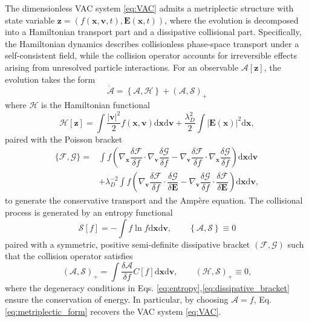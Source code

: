 \documentclass[preprint,1p,times]{elsarticle}
\theoremstyle{definition}
\theoremstyle{remark}
\begin{document}
The dimensionless VAC system \eqref{eq:VAC} admits a metriplectic structure \cite{morrison1986paradigm} with state variable $\bm z=(f(\bm{x},\bm{v},t), \bm{E}(\bm{x},t))$, where the evolution is decomposed into a Hamiltonian transport part and a dissipative collisional part. Specifically, the Hamiltonian dynamics describes collisionless phase-space transport under a self-consistent field, while the collision operator accounts for irreversible effects arising from unresolved particle interactions. 
For an observable $\mathcal{A}[\bm z]$, the evolution takes the form
\begin{equation}
\dot{\mathcal{A}} = \left\{\mathcal{A}, \mathcal{H}\right\} + \left(\mathcal{A}, \mathcal{S}\right)_+
\label{eq:metriplectic_form}
\end{equation}
where $\mathcal{H}$ is the Hamiltonian functional 
\begin{equation*}
    \mathcal{H}[\bm z] = \int \dfrac{|\bm{v}|^{2}}{2} f(\bm{x},\bm{v}) \mathrm{d} \bm{x} \mathrm{d} \bm{v} + \dfrac{\lambda_{D}^{2}}{2} \int |\bm{E}(\bm{x})|^{2} \mathrm{d} \bm{x},
\label{eq:energy}
\end{equation*}
paired with the Poisson bracket
\begin{equation}\label{eq:poisson_bracket}
\begin{aligned}
    \{ \mathcal{F} , \mathcal{G} \} =& \int f \left( \nabla_{\bm{x}}\dfrac{\delta \mathcal{F}}{\delta f} \cdot \nabla_{\bm{v}}\dfrac{\delta \mathcal{G}}{\delta f}  - \nabla_{\bm{v}}\dfrac{\delta \mathcal{F}}{\delta f} \cdot \nabla_{\bm{x}}\dfrac{\delta \mathcal{G}}{\delta f} \right) \mathrm{d}\bm{x} \mathrm{d} \bm{v} \\
    &+ \lambda_{D}^{-2} \int f \left( \nabla_{\bm{v}} \dfrac{\delta \mathcal{F}}{\delta f} \cdot \dfrac{\delta \mathcal{G}}{\delta \bm{E}} - \nabla_{\bm{v}} \dfrac{\delta \mathcal{G}}{\delta f} \cdot \dfrac{\delta \mathcal{F}}{\delta \bm{E}} \right)
    \mathrm{d}\bm{x} \mathrm{d} \bm{v}  ,
\end{aligned}
\end{equation}
to generate the conservative transport and the Amp\`ere equation. The collisional process is generated by an entropy functional
\begin{equation}
    \mathcal{S}[f] = -\int f \ln f \mathrm{d} \bm{x} \mathrm{d} \bm{v}, \qquad \left\{\mathcal{A}, \mathcal{S}\right\} \equiv 0
\label{eq:entropy}
\end{equation}
paired with a symmetric, positive semi-definite dissipative bracket $(\mathcal{F},\mathcal{G})$ such that the collision operator satisfies
\begin{equation}
    (\mathcal{A}, \mathcal{S})_+ = \int \dfrac{\delta \mathcal{A}}{\delta f} C[f] \mathrm{d} \bm{x} \mathrm{d} \bm{v},  \qquad (\mathcal{H}, \mathcal{S})_+ \equiv 0,
\label{eq:dissipative_bracket}
\end{equation}
where the degeneracy conditions in Eqs. \eqref{eq:entropy},\eqref{eq:dissipative_bracket} ensure the conservation of energy. In particular, by choosing $\mathcal{A} = f$, Eq. \eqref{eq:metriplectic_form} recovers the VAC system \eqref{eq:VAC}.
\end{document}
